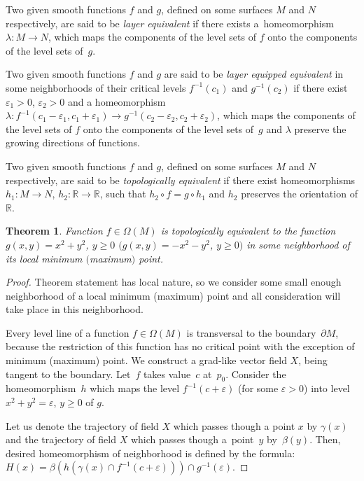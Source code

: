 \documentclass[10pt,a4paper]{amsart}
\numberwithin{equation}{section}
\newtheorem{Theorem}{Theorem}[section]
\begin{document}
\begin{Definition}\label{definition2.1}
Two given smooth functions $f$ and $g$, def\/ined on some surfaces $M$ and $N$ respectively, are said to be \emph{layer equivalent} if there exists a~homeomorphism $\lambda \colon M\rightarrow N$, which maps the components of the level sets of $f$ onto the components of the level sets of~$g$.
\end{Definition}

\begin{Definition}\label{definition2.2}
Two given smooth functions $f$ and $g$ are said to be \emph{layer equipped equivalent} in some neighborhoods of their critical levels $f^{-1}(c_{1})$ and $g^{-1}(c_{2})$ if there exist $\varepsilon_{1}>0$, $\varepsilon_{2}>0$ and a homeomorphism $\lambda \colon f^{-1}(c_{1}-\varepsilon_{1},c_{1}+\varepsilon_{1}) \rightarrow g^{-1}(c_{2}-\varepsilon_{2},c_{2}+\varepsilon_{2})$, which maps the components of the level sets of $f$ onto the components of the level sets of~$g$ and $\lambda$ preserve the growing directions of functions.
\end{Definition}

\begin{Definition}\label{definition2.3}
Two given smooth functions $f$ and $g$, def\/ined on some surfaces $M$ and $N$ respectively, are said to be \emph{topologically equivalent} if there exist homeomorphisms $h_1\colon M\rightarrow N$, $h_2\colon \mathbb{R}\rightarrow\mathbb{R}$, such that $h_2\circ f=g\circ h_1$ and $h_2$ preserves the orientation of $\mathbb{R}$.
\end{Definition}

\begin{Theorem}\label{theorem2.1}
Function $f\in\Omega(M)$ is topologically equivalent to the function $g(x,y)=x^{2}+y^{2}$, $y\geq0$ $(g(x,y)=-x^{2}-y^{2}$, $y\geq0)$ in some neighborhood of its local minimum $($maximum$)$ point.
\end{Theorem}

\begin{proof}
Theorem statement has local nature, so we consider some small enough neighborhood of a local minimum (maximum) point and all consideration will take place in this neighborhood.

Every level line of a function $f\in\Omega(M)$ is transversal to the boundary~$\partial M$, because the restriction of this function has no critical point with the exception of minimum (maximum) point. We construct a grad-like vector f\/ield $X$, being tangent to the boundary. Let~$f$ takes value~$c$ at~$p_{0}$. Consider the homeomorphism~$h$ which maps the level $f^{-1}(c+\varepsilon)$ (for some $\varepsilon>0$) into level $x^{2}+y^{2}=\varepsilon$, $y\geq0$ of $g$.

Let us denote the trajectory of f\/ield $X$ which passes though a point $x$ by $\gamma(x)$ and the trajectory of f\/ield $X$ which passes though a~point~$y$ by~$\beta(y)$. Then, desired homeomorphism of neighborhood is def\/ined by the formula: $H(x)=\beta(h(\gamma(x)\cap f^{-1}(c+\varepsilon)))\cap g^{-1}(\varepsilon)$.
\end{proof}
\end{document}
